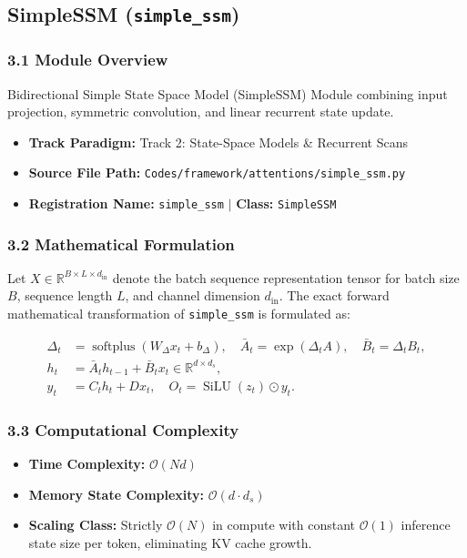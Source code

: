 \subsection{SimpleSSM (\texttt{simple\_ssm})}
\label{sec:app_module_simple\_ssm}

\subsubsection*{3.1 Module Overview}
Bidirectional Simple State Space Model (SimpleSSM) Module combining input projection, symmetric convolution, and linear recurrent state update.
\begin{itemize}
    \item \textbf{Track Paradigm:} Track 2: State-Space Models & Recurrent Scans
    \item \textbf{Source File Path:} \texttt{Codes/framework/attentions/simple\_ssm.py}
    \item \textbf{Registration Name:} \texttt{simple\_ssm} $\mid$ \textbf{Class:} \texttt{SimpleSSM}
\end{itemize}

\subsubsection*{3.2 Mathematical Formulation}
Let $X \in \mathbb{R}^{B \times L \times d_{\text{in}}}$ denote the batch sequence representation tensor for batch size $B$, sequence length $L$, and channel dimension $d_{\text{in}}$. The exact forward mathematical transformation of \texttt{simple\_ssm} is formulated as:

\begin{align}
\Delta_t &= \operatorname{softplus}(W_\Delta x_t + b_\Delta), \quad \bar{A}_t = \exp(\Delta_t A), \quad \bar{B}_t = \Delta_t B_t, \\
h_t &= \bar{A}_t h_{t-1} + \bar{B}_t x_t \in \mathbb{R}^{d \times d_s}, \\
y_t &= C_t h_t + D x_t, \quad O_t = \operatorname{SiLU}(z_t) \odot y_t.
\end{align}


\subsubsection*{3.3 Computational Complexity}
\begin{itemize}
    \item \textbf{Time Complexity:} $\mathcal{O}(N d)$
    \item \textbf{Memory State Complexity:} $\mathcal{O}(d \cdot d_s)$
    \item \textbf{Scaling Class:} Strictly $\mathcal{O}(N)$ in compute with constant $\mathcal{O}(1)$ inference state size per token, eliminating KV cache growth.
\end{itemize}


